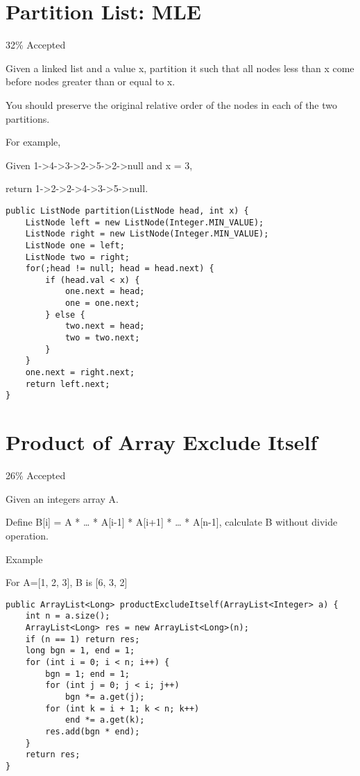 \documentclass[12pt]{book}
\begin{document}
\chapter{Partition List: MLE}
\label{sec-50}

32\% Accepted

Given a linked list and a value x, partition it such that all nodes less than x come before nodes greater than or equal to x.

You should preserve the original relative order of the nodes in each of the two partitions.

For example,

Given 1->4->3->2->5->2->null and x = 3,

return 1->2->2->4->3->5->null.
\lstset{language=java,label= ,caption= ,numbers=none}
\begin{lstlisting}
public ListNode partition(ListNode head, int x) {
    ListNode left = new ListNode(Integer.MIN_VALUE);
    ListNode right = new ListNode(Integer.MIN_VALUE);
    ListNode one = left;
    ListNode two = right;
    for(;head != null; head = head.next) {
        if (head.val < x) {
            one.next = head;
            one = one.next;
        } else {
            two.next = head;
            two = two.next;
        }
    }
    one.next = right.next;
    return left.next;
}
\end{lstlisting}
\chapter{Product of Array Exclude Itself}
\label{sec-51}

26\% Accepted

Given an integers array A.

Define B[i] = A\footnotemark[1]{} * \ldots{} * A[i-1] * A[i+1] * \ldots{} * A[n-1], calculate B without divide operation.

Example

For A=[1, 2, 3], B is [6, 3, 2]
\lstset{language=java,label= ,caption= ,numbers=none}
\begin{lstlisting}
public ArrayList<Long> productExcludeItself(ArrayList<Integer> a) {
    int n = a.size();
    ArrayList<Long> res = new ArrayList<Long>(n);
    if (n == 1) return res;
    long bgn = 1, end = 1;
    for (int i = 0; i < n; i++) {
        bgn = 1; end = 1;
        for (int j = 0; j < i; j++) 
            bgn *= a.get(j);
        for (int k = i + 1; k < n; k++) 
            end *= a.get(k);
        res.add(bgn * end);
    }
    return res;
}
\end{lstlisting}
\end{document}
